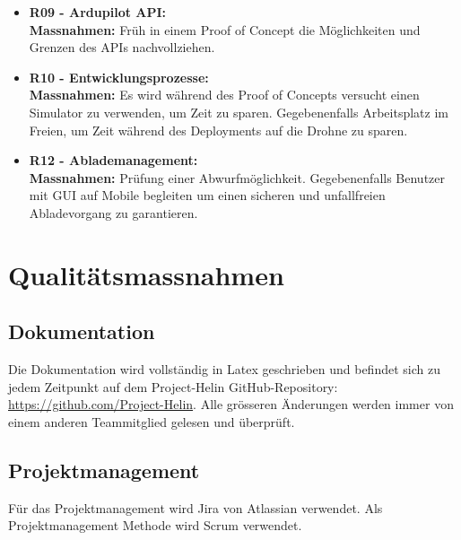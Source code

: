 \begin{itemize}
	\item{\textbf{R09 - Ardupilot API:} \\
	\textbf{Massnahmen:} Früh in einem Proof of Concept die Möglichkeiten und Grenzen des APIs nachvollziehen.}
	
	\item{\textbf{R10 - Entwicklungsprozesse:} \\
	\textbf{Massnahmen:} Es wird während des Proof of Concepts versucht einen Simulator zu verwenden, um Zeit zu sparen. Gegebenenfalls Arbeitsplatz im Freien, um Zeit während des Deployments auf die Drohne zu sparen.}
	
	\item{\textbf{R12 - Ablademanagement:} \\
	\textbf{Massnahmen:} Prüfung einer Abwurfmöglichkeit. Gegebenenfalls Benutzer mit GUI auf Mobile begleiten um einen sicheren und unfallfreien Abladevorgang zu garantieren.}
\end{itemize}

\newpage
\section{Qualitätsmassnahmen}	
\subsection{Dokumentation}
Die Dokumentation wird vollständig in Latex geschrieben und befindet sich zu jedem Zeitpunkt auf dem Project-Helin GitHub-Repository: \url{https://github.com/Project-Helin}. Alle grösseren Änderungen werden immer von einem anderen Teammitglied gelesen und überprüft.

\subsection{Projektmanagement}
Für das Projektmanagement wird Jira von Atlassian verwendet. Als Projektmanagement Methode wird Scrum verwendet.

